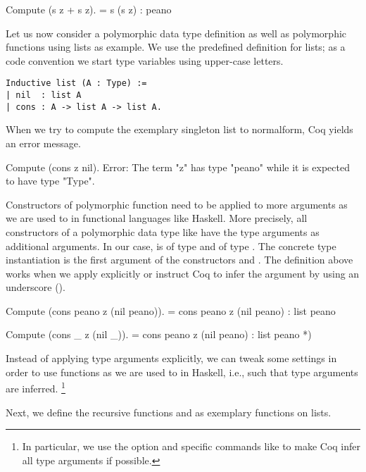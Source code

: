 \begin{crepl}
\coqrepl Compute (s z + s z).
   = s (s z)
   : peano
\end{crepl}

Let us now consider a polymorphic data type definition as well as polymorphic functions using lists as example.
We use the predefined definition for lists; as a code convention we start type variables using upper-case letters.

\begin{verbatim}
Inductive list (A : Type) :=
| nil  : list A
| cons : A -> list A -> list A.
\end{verbatim}

When we try to compute the exemplary singleton list  to normalform, Coq yields an error message.

\begin{crepl}
\coqrepl Compute (cons z nil).
Error: The term "z" has type "peano" while it is expected to have type
       "Type".
\end{crepl}

Constructors of polymorphic function need to be applied to more arguments as we are used to in functional languages like Haskell.
More precisely, all constructors of a polymorphic data type like  have the type arguments as additional arguments.
In our case,  is of type  and  of type .
The concrete type instantiation is the first argument of the constructors  and .
The definition above works when we apply  explicitly or instruct Coq to infer the argument by using an underscore (\cinl{_}).

\begin{crepl}
\coqrepl Compute (cons peano z (nil peano)).
    = cons peano z (nil peano)
    : list peano

\coqrepl Compute (cons _ z (nil _)).
    = cons peano z (nil peano)
    : list peano *)
\end{crepl}

Instead of applying type arguments explicitly, we can tweak some settings in order to use functions as we are used to in Haskell, i.e., such that type arguments are inferred. \footnote{In particular, we use the option  and specific commands like  to make Coq infer all type arguments if possible.}

Next, we define the recursive functions  and  as exemplary functions on lists.

